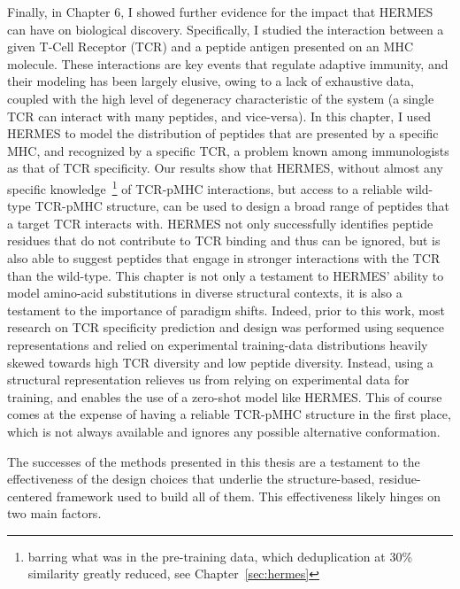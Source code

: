 Finally, in Chapter 6, I showed further evidence for the impact that HERMES can have on biological discovery.
Specifically, I studied the interaction between a given T-Cell Receptor (TCR) and a peptide antigen presented
on an MHC molecule. These interactions are key events that regulate adaptive immunity, and their modeling has been largely elusive,
owing to a lack of exhaustive data, coupled with the high level of degeneracy characteristic of the system (a single TCR can interact
with many peptides, and vice-versa).
In this chapter, I used HERMES to model the distribution of peptides that are presented by a specific MHC, and recognized by a specific TCR,
a problem known among immunologists as that of TCR specificity.
Our results show that HERMES, without almost any specific knowledge~\footnote{barring what was in the pre-training data, which deduplication
at 30\% similarity greatly reduced, see Chapter~\ref{sec:hermes}}
of TCR-pMHC interactions, but access to a reliable wild-type TCR-pMHC structure, can be used to design a broad range of peptides that a target TCR
interacts with. HERMES not only successfully identifies peptide residues that do not contribute to TCR binding and thus can be ignored,
but is also able to suggest peptides that engage in stronger interactions with the TCR than the wild-type.
This chapter is not only a testament to HERMES' ability to model amino-acid substitutions in diverse structural contexts,
it is also a testament to the importance of paradigm shifts.
Indeed, prior to this work, most research on TCR specificity prediction and design was performed using sequence representations
and relied on experimental training-data distributions heavily skewed towards high TCR diversity and low peptide diversity.
Instead, using a structural representation relieves us from relying on experimental data for training, and enables
the use of a zero-shot model like HERMES. This of course comes at the expense of having a reliable TCR-pMHC structure in the first place,
which is not always available and ignores any possible alternative conformation.




The successes of the methods presented in this thesis are a testament to the effectiveness of the design choices
that underlie the structure-based, residue-centered framework used to build all of them.
This effectiveness likely hinges on two main factors.

